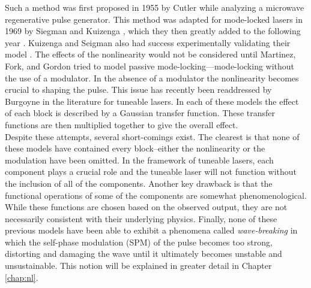 Such a method was first proposed in 1955 by Cutler \cite{cutler} while analyzing a microwave regenerative pulse generator. This method was adapted for mode-locked lasers in 1969 by Siegman and Kuizenga \cite{seigman}, which they then greatly added to the following year \cite{kuizenga1970a}. Kuizenga and Seigman also had success experimentally validating their model \cite{kuizenga1970b, kuizenga1970}. The effects of the nonlinearity would not be considered until Martinez, Fork, and Gordon \cite{martinez1984, martinez1985} tried to model passive mode-locking---mode-locking without the use of a modulator. In the absence of a modulator the nonlinearity becomes crucial to shaping the pulse. This issue has recently been readdressed by Burgoyne \cite{burgoyne2014} in the literature for tuneable lasers. In each of these models the effect of each block is described by a Gaussian transfer function. These transfer functions are then multiplied together to give the overall effect. \\

Despite these attempts, several short-comings exist. The clearest is that none of these models have contained every block--either the nonlinearity or the modulation have been omitted. In the framework of tuneable lasers, each component plays a crucial role and the tuneable laser will not function without the inclusion of all of the components. Another key drawback is that the functional operations of some of the components are somewhat phenomenological. While these functions are chosen based on the observed output, they are not necessarily consistent with their underlying physics. Finally, none of these previous models have been able to exhibit a phenomena called \emph{wave-breaking} in which the self-phase modulation (SPM) of the pulse becomes too strong, distorting and damaging the wave until it ultimately becomes unstable and unsustainable. This notion will be explained in greater detail in Chapter \ref{chap:nl}. \\
